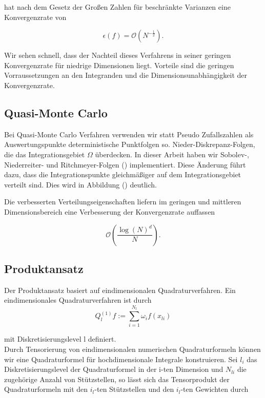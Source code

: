 \documentclass[12pt,a4paper]{scrartcl}
\numberwithin{equation}{section}
\begin{document}
{ hat nach dem Gesetz der Großen Zahlen für beschränkte Varianzen eine Konvergenzrate von 
 
 \begin{equation}
  \epsilon(f) = \mathcal{O}(N^{-\frac{1}{2}}).
 \end{equation}
 
 Wir sehen schnell, dass der Nachteil dieses Verfahrens in seiner geringen Konvergenzrate für niedrige Dimensionen
 liegt. Vorteile sind die geringen Vorraussetzungen an den Integranden und die Dimensionsunabhängigkeit der
 Konvergenzrate. 
 
 \subsection{Quasi-Monte Carlo}
 
 Bei Quasi-Monte Carlo Verfahren verwenden wir statt Pseudo Zufallszahlen als Auswertungspunkte 
 deterministische Punktfolgen so. Nieder-Diskrepanz-Folgen, die das Integrationsgebiet $\Omega$
 überdecken. In dieser Arbeit haben wir Sobolev-, Niederreiter- und Ritchmeyer-Folgen () implementiert. 
 Diese Änderung führt dazu, dass die Integrationspunkte gleichmäßiger auf dem Integrationsgebiet verteilt sind.
 Dies wird in Abbildung () deutlich. 
 
 Die verbesserten Verteilungseigenschaften liefern im geringen und mittleren Dimensionsbereich eine Verbesserung 
 der Konvergenzrate auffassen
 
 \begin{equation}
  \mathcal{O}(\frac{\log(N)^d}{N}).
 \end{equation}
 
 \subsection{Produktansatz}
 
 Der Produktansatz basiert auf eindimensionalen Quadraturverfahren. Ein eindimensionales Quadraturverfahren ist durch
 \begin{equation}
  Q_l^{(1)}f := \sum_{i = 1}^{N_l} \omega_i f(x_{li}) 
 \end{equation}
 
 mit Diskretisierungslevel l definiert. \\
 Durch Tensorierung von eindimensionalen numerischen Quadraturformeln können wir eine Quadraturformel 
 für hochdimensionale Integrale konstruieren. 
 Sei $l_i$ das Diskretisierungslevel der Quadraturformel in der i-ten Dimension und $N_{li}$ die zugehörige 
 Anzahl von Stützstellen, so lässt sich das Tensorprodukt der Quadraturformeln mit den $i_l$-ten Stützstellen und den $i_l$-ten Gewichten durch 
 
}
\end{document}
